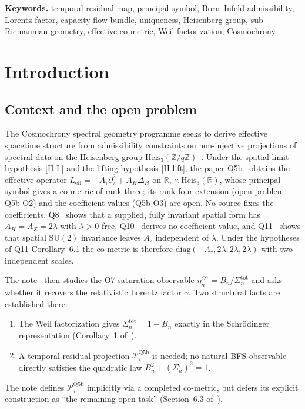\documentclass[11pt,a4paper]{article}
\begin{document}
  \noindent\textbf{Keywords.}
  temporal residual map, principal symbol, Born--Infeld admissibility, Lorentz factor,
  capacity-flow bundle, uniqueness, Heisenberg group, sub-Riemannian geometry,
  effective co-metric, Weil factorization, Cosmochrony.

  \newpage
  \tableofcontents

  \newpage

  \section{Introduction}

    \subsection{Context and the open problem}

      The Cosmochrony spectral geometry programme seeks to derive effective spacetime structure from
      admissibility constraints on non-injective projections of spectral data on the Heisenberg
      group $\mathrm{Heis}_3(\mathbb{Z}/q\mathbb{Z})$~\cite{Beau2026m}.
      Under the spatial-limit hypothesis [H-L] and the lifting hypothesis [H-lift], the paper
      Q5b~\cite{Beau2026q5b} obtains the effective operator
      $L_{\mathrm{eff}} = -A_\tau\partial_\tau^2 + A_H\Delta_H$ on
      $\mathbb{R}_\tau \times \mathrm{Heis}_3(\mathbb{R})$, whose principal symbol gives a co-metric of rank three;
      its rank-four extension (open problem Q5b-O2) and the coefficient values (Q5b-O3) are open.
      No source fixes the coefficients.
      Q8~\cite{BeauQ8} shows that a supplied, fully invariant spatial form has $A_H = A_Z = 2\lambda$ with
      $\lambda > 0$ free, Q10~\cite{Beau2026q10} derives no coefficient value, and Q11~\cite{Beau2026q11} shows that
      spatial $\mathrm{SU}(2)$ invariance leaves $A_\tau$ independent of $\lambda$.
      Under the hypotheses of Q11 Corollary~6.1 the co-metric is therefore
      $\mathrm{diag}(-A_\tau, 2\lambda, 2\lambda, 2\lambda)$ with two independent scales.

      The note~\cite{Beau2026n} then studies the O7 saturation observable $\eta_n^{O7} =
  B_n/\Sigma_n^{\mathrm{tot}}$ and asks whether it recovers the relativistic Lorentz factor
      $\gamma$.
      Two structural facts are established there:
      \begin{enumerate}
        \item The Weil factorization gives $\Sigma_n^{\mathrm{tot}} = 1 - B_n$ exactly in the
        Schr\"odinger representation (Corollary~1 of~\cite{Beau2026n}).
        \item A temporal residual projection $\mathcal{P}_\tau^{\mathrm{Q5b}}$ is needed;
        no natural BFS observable directly satisfies the quadratic law
        $B_n^2 + (\Sigma_n^\tau)^2 = 1$.
      \end{enumerate}
      The note defines $\mathcal{P}_\tau^{\mathrm{Q5b}}$ implicitly via a completed
      co-metric, but defers its explicit construction as ``the remaining open
      task'' (Section~6.3 of~\cite{Beau2026n}).
\end{document}

